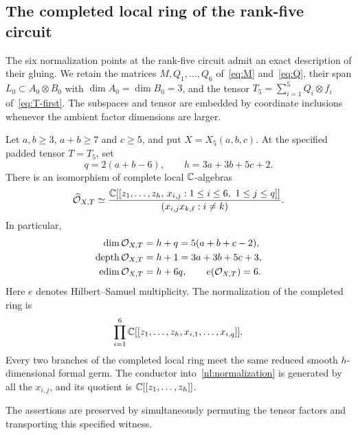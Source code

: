 \subsection{The completed local ring of the rank-five circuit}
\label{nl:section}

The six normalization points at the rank-five circuit admit an exact
description of their gluing. We retain the matrices
$M,Q_1,\ldots,Q_6$ of~\eqref{eq:M} and~\eqref{eq:Q}, their span
$L_0\subset A_0\otimes B_0$ with $\dim A_0=\dim B_0=3$, and the tensor
$T_5=\sum_{i=1}^5Q_i\otimes f_i$ of~\eqref{eq:T-first}.
The subspaces and tensor are embedded by coordinate inclusions whenever
the ambient factor dimensions are larger.

\begin{theorem}\label{nl:theorem}
Let $a,b\geq3$, $a+b\geq7$ and $c\geq5$, and put
$X=X_5(a,b,c)$. At the specified padded tensor $T=T_5$, set
\begin{equation}\label{nl:parameters}
 q=2(a+b-6),\qquad h=3a+3b+5c+2.
\end{equation}
There is an isomorphism of complete local $\mathbb C$-algebras
\begin{equation}\label{nl:completed-ring}
 \widehat{\mathcal O}_{X,T}\simeq
 \frac{\mathbb C[[z_1,\ldots,z_h,\,
              x_{i,j}:1\leq i\leq6,\ 1\leq j\leq q]]}
      {(x_{i,j}x_{k,\ell}:i\neq k)}.
\end{equation}
In particular,
\begin{align}
 \dim\mathcal O_{X,T}&=h+q=5(a+b+c-2),\label{nl:dimension}\\
 \operatorname{depth}\mathcal O_{X,T}&=h+1=3a+3b+5c+3,\label{nl:depth}\\
 \operatorname{edim}\mathcal O_{X,T}&=h+6q,\qquad
 e(\mathcal O_{X,T})=6.\label{nl:embedding-multiplicity}
\end{align}
Here $e$ denotes Hilbert--Samuel multiplicity. The normalization of the
completed ring is
\begin{equation}\label{nl:normalization}
 \prod_{i=1}^6\mathbb C[[z_1,\ldots,z_h,x_{i,1},\ldots,x_{i,q}]].
\end{equation}
Every two branches of the completed local ring meet the same reduced smooth
$h$-dimensional formal germ. The conductor into~\eqref{nl:normalization}
is generated by all the $x_{i,j}$, and its quotient is
$\mathbb C[[z_1,\ldots,z_h]]$.

The assertions are preserved by simultaneously permuting the tensor
factors and transporting this specified witness.
\end{theorem}

